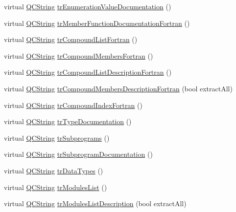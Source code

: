 \begin{DoxyCompactItemize}
\item 
virtual \hyperlink{class_q_c_string}{Q\-C\-String} \hyperlink{class_translator_slovak_a4039294191fddf0e9530b920719998fd}{tr\-Enumeration\-Value\-Documentation} ()
\item 
virtual \hyperlink{class_q_c_string}{Q\-C\-String} \hyperlink{class_translator_slovak_a006270b30df57f83fe40ad0ed617652e}{tr\-Member\-Function\-Documentation\-Fortran} ()
\item 
virtual \hyperlink{class_q_c_string}{Q\-C\-String} \hyperlink{class_translator_slovak_a17985bd956c4940e53e169cadb659c2b}{tr\-Compound\-List\-Fortran} ()
\item 
virtual \hyperlink{class_q_c_string}{Q\-C\-String} \hyperlink{class_translator_slovak_add44aa8baf655554ec74dbfac0d43f71}{tr\-Compound\-Members\-Fortran} ()
\item 
virtual \hyperlink{class_q_c_string}{Q\-C\-String} \hyperlink{class_translator_slovak_a10aa72b35051f95ba30f2b0312ce705c}{tr\-Compound\-List\-Description\-Fortran} ()
\item 
virtual \hyperlink{class_q_c_string}{Q\-C\-String} \hyperlink{class_translator_slovak_a0c98da65b5772e9c2876855a42d44127}{tr\-Compound\-Members\-Description\-Fortran} (bool extract\-All)
\item 
virtual \hyperlink{class_q_c_string}{Q\-C\-String} \hyperlink{class_translator_slovak_a933624b6cffb8fdc03e9fc4110640fc9}{tr\-Compound\-Index\-Fortran} ()
\item 
virtual \hyperlink{class_q_c_string}{Q\-C\-String} \hyperlink{class_translator_slovak_ae031421205271f1a32fa3838a79b8902}{tr\-Type\-Documentation} ()
\item 
virtual \hyperlink{class_q_c_string}{Q\-C\-String} \hyperlink{class_translator_slovak_a8d4e1de8fb5c2af1fd073c682556f999}{tr\-Subprograms} ()
\item 
virtual \hyperlink{class_q_c_string}{Q\-C\-String} \hyperlink{class_translator_slovak_add6df0842eb6016d108814567d677055}{tr\-Subprogram\-Documentation} ()
\item 
virtual \hyperlink{class_q_c_string}{Q\-C\-String} \hyperlink{class_translator_slovak_a77941890cf3f7cd1b67bec4cea91439b}{tr\-Data\-Types} ()
\item 
virtual \hyperlink{class_q_c_string}{Q\-C\-String} \hyperlink{class_translator_slovak_a411e2c242c2707aed706b2b0572292db}{tr\-Modules\-List} ()
\item 
virtual \hyperlink{class_q_c_string}{Q\-C\-String} \hyperlink{class_translator_slovak_a4f1ad06ac7478b9058d7f388a2b67566}{tr\-Modules\-List\-Description} (bool extract\-All)

\end{DoxyCompactItemize}
